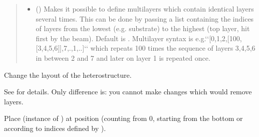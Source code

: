 \documentclass[letterpaper,10pt,english]{sphinxmanual}
\begin{document}
\begin{fulllineitems}
\begin{fulllineitems}
\begin{quote}
\begin{description}
\begin{itemize}
\item {} 
 () \textendash{} Makes it possible to define multilayers which contain identical layers several times.
This can be done by passing a list containing the indices of layers from the lowest (e.g. substrate) to the highest (top layer, hit first by the beam).
Default is . Multilayer syntax is e.g.{}`{}`{[}0,1,2,{[}100,{[}3,4,5,6{]}{]},7,.,1,..{]}{}`{}` which repeats 100 times the sequence of
layers 3,4,5,6 in between 2 and 7 and later on layer 1 is repeated once.

\end{itemize}

\end{description}\end{quote}

\end{fulllineitems}


\begin{fulllineitems}
\label{\detokenize{modules-api/samplerepresentation:SampleRepresentation.Heterostructure.setLayout}}
Change the layout of the heterostructure.

See {\hyperref[\detokenize{modules-api/samplerepresentation:SampleRepresentation.Heterostructure.__init__}]{}} for details. Only difference is: you cannot make changes which would remove layers.

\end{fulllineitems}


\begin{fulllineitems}
\label{\detokenize{modules-api/samplerepresentation:SampleRepresentation.Heterostructure.setLayer}}
Place  (instance of {\hyperref[\detokenize{modules-api/samplerepresentation:SampleRepresentation.LayerObject}]{}}) at position  (counting from 0, starting from the bottom or according to indices defined by ).


\end{fulllineitems}
\end{fulllineitems}
\end{document}
